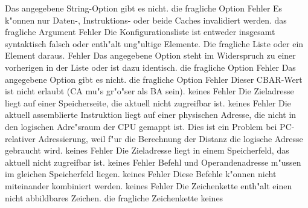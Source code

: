 \documentclass[12pt,a4paper,twoside]{report}
\begin{document}
\begin{description}
               {Das angegebene String-Option gibt es nicht.}
               {die fragliche Option}
               {Fehler}
               {Es k"onnen nur Daten-, Instruktions- oder beide Caches invalidiert werden.}
               {das fragliche Argument}
               {Fehler}
               {Die Konfigurationsliste ist entweder insgesamt syntaktisch falsch oder 
                enth"alt ung"ultige Elemente.}
               {Die fragliche Liste oder ein Element daraus.}
               {Fehler}
               {Das angegebene Option steht im Widerspruch zu einer vorherigen in der Liste oder ist dazu identisch.}
               {die fragliche Option}
               {Fehler}
               {Das angegebene Option gibt es nicht.}
               {die fragliche Option}
               {Fehler}
               {Dieser CBAR-Wert ist nicht erlaubt (CA mu"s gr"o"ser als BA sein).}
               {keines}
               {Fehler}
               {Die Zieladresse liegt auf einer Speicherseite, die aktuell nicht
                zugreifbar ist.}
               {keines}
               {Fehler}
               {Die aktuell assemblierte Instruktion liegt auf einer physischen
                Adresse, die nicht in den logischen Adre"sraum der CPU gemappt
                ist.  Dies ist ein Problem bei PC-relativer Adressierung, weil
                f"ur die Berechnung der Distanz die logische Adresse gebraucht
                wird.}
               {keines}
               {Fehler}
               {Die Zieladresse liegt in einem Speicherfeld, das aktuell nicht
                zugreifbar ist.}
               {keines}
               {Fehler}
               {Befehl und Operandenadresse m"ussen
                im gleichen Speicherfeld liegen.}
               {keines}
               {Fehler}
               {Diese Befehle k"onnen nicht miteinander kombiniert werden.}
               {keines}
               {Fehler}
               {Die Zeichenkette enth"alt einen nicht abbildbares Zeichen.}
               {die fragliche Zeichenkette}
               {keines}

\end{description}
\end{document}
